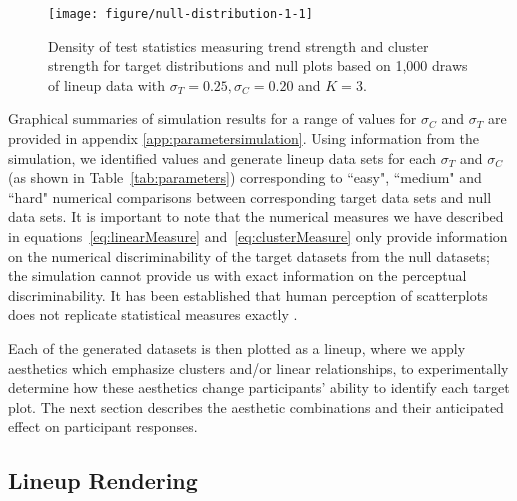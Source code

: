 \documentclass[12pt]{article}\usepackage[]{graphicx}\usepackage[]{color}
\makeatletter
\def\maxwidth{ %
  \ifdim\Gin@nat@width>\linewidth
    \linewidth
  \else
    \Gin@nat@width
  \fi
}
\newenvironment{knitrout}{}{} %
\newcommand{\newdo}[1]{\todo[inline, color=Lime]{#1}} %
\makeatother
\begin{document}
\begin{figure}[ht]
\centering
\begin{knitrout}
\color{fgcolor}

{\centering \texttt{[image: figure/null-distribution-1-1]} 

}



\end{knitrout}
\caption[Simulation-based test statistic density for null and target plots]{\label{fig:targetsignal-0}Density of test statistics measuring trend strength and cluster strength for target distributions and null plots based on 1,000 draws of lineup data with $\sigma_T= 0.25, \sigma_C=0.20$ and $K=3$. }
\end{figure}

Graphical summaries of simulation results for a range of values for $\sigma_C$ and $\sigma_T$ are provided in appendix \ref{app:parametersimulation}. Using information from the simulation, we identified values and generate lineup data sets for each  $\sigma_T$ and $\sigma_C$ (as shown in Table~\ref{tab:parameters}) corresponding to ``easy", ``medium" and ``hard" numerical comparisons between corresponding target data sets and null data sets. It is important to note that the numerical measures we have described in equations~\eqref{eq:linearMeasure} and~\eqref{eq:clusterMeasure} only provide information on the numerical discriminability of the target datasets from the null datasets; the simulation cannot provide us with exact information on the perceptual discriminability. It has been established that human perception of scatterplots does not replicate statistical measures exactly \citep{bobko1979perception, mosteller1981eye, lewandowsky1989perception}.


Each of the generated datasets is then plotted as a lineup, where we apply aesthetics which emphasize clusters and/or linear relationships, to experimentally determine how these aesthetics change participants' ability to identify each target plot. The next section describes the aesthetic combinations and their anticipated effect on participant responses. 

\subsection{Lineup Rendering}
\end{document}
